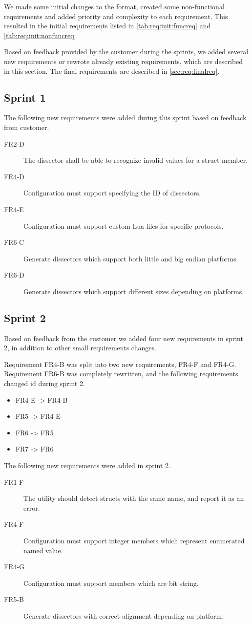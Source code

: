 We made some initial changes to the format, created some non-functional
requirements and added priority and complexity to each requirement.
This resulted in the initial requirements listed in
\autoref{tab:req:init:funcreq} and \autoref{tab:req:init:nonfuncreq}.

Based on feedback provided by the customer during the sprints, we added
several new requirements or rewrote already existing requirements, which
are described in this section. The final requirements are described in
\autoref{sec:req:finalreq}.

\subsection{Sprint 1}
\label{sec:req:sprint1evo}
The following new requirements were added during this sprint based on feedback from customer.
\begin{description}
	\item[FR2-D] The dissector shall be able to recognize invalid values for a struct member.
	\item[FR4-D] Configuration must support specifying the ID of dissectors.
	\item[FR4-E] Configuration must support custom Lua files for specific protocols.
	\item[FR6-C] Generate dissectors which support both little and big endian platforms.
	\item[FR6-D] Generate dissectors which support different sizes depending on platforms.
\end{description}

\subsection{Sprint 2}
\label{sec:req:sprint1evo}
\label{sec:req:sprint2evo}
Based on feedback from the customer we added four new requirements in sprint
2, in addition to other small requirements changes.

Requirement FR4-B was split into two new requirements, FR4-F and FR4-G.
Requirement FR6-B was completely rewritten, and the following requirements
changed id during sprint 2.
\begin{itemize}
	\item FR4-E -> FR4-B
	\item FR5 -> FR4-E
	\item FR6 -> FR5
	\item FR7 -> FR6
\end{itemize}
The following new requirements were added in sprint 2.
\begin{description}
	\item[FR1-F] The utility should detect structs with the same name, and report it as an error.
	\item[FR4-F] Configuration must support integer members which represent enumerated named value.	
	\item[FR4-G] Configuration must support members which are bit string.
	\item[FR5-B] Generate dissectors with correct alignment depending on platform.
\end{description}

